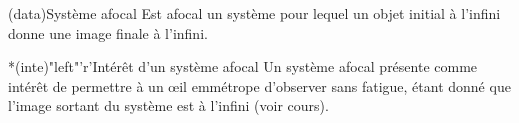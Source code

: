 \documentclass[../../main/main.tex]{subfiles}
\begin{document}
{	\subsubsection{}
	\begin{tcbraster}[raster columns=2, raster equal height=rows]
		\begin{tcb}(data){Système afocal}
			Est afocal un système pour lequel un objet initial à l'infini donne une
			image finale à l'infini.
		\end{tcb}
		\begin{tcb}*(inte)"left"'r'{Intérêt d'un système afocal}
			Un système afocal présente comme intérêt de permettre à un œil emmétrope
			d'observer sans fatigue, étant donné que l'image sortant du système est à
			l'infini (voir cours).
		\end{tcb}
	\end{tcbraster}

	\subsubsection{}\label{sssec:k_encomb}

}
\end{document}
